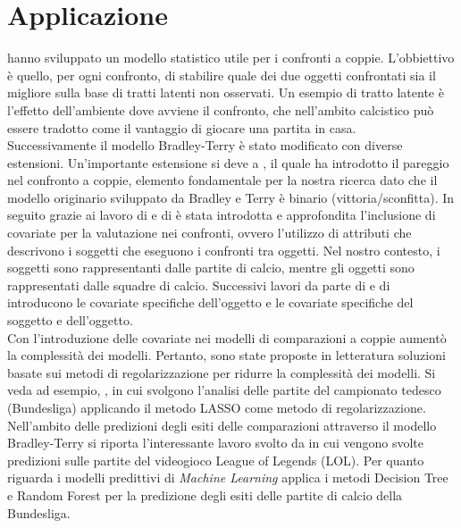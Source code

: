 \section{Applicazione}
\textcite{bradley1952rank} hanno sviluppato un modello statistico utile per i confronti a coppie. L'obbiettivo è quello, per ogni confronto, di stabilire quale dei due oggetti confrontati sia il migliore sulla base di tratti latenti non osservati. Un esempio di tratto latente è l'effetto dell'ambiente dove avviene il confronto, che nell'ambito calcistico può essere tradotto come il vantaggio di giocare una partita in casa. \\
Successivamente il modello Bradley-Terry è stato modificato con diverse estensioni. Un'importante estensione si deve a \textcite{davidson1970extending}, il quale ha introdotto il pareggio nel confronto a coppie, elemento fondamentale per la nostra ricerca dato che il modello originario sviluppato da Bradley e Terry è binario (vittoria/sconfitta). In seguito grazie ai lavoro di \textcite{francis2010} e di \textcite{Turner2012Firth} è stata introdotta e approfondita l'inclusione di covariate per la valutazione nei confronti, ovvero l'utilizzo di attributi che descrivono i soggetti che eseguono i confronti tra oggetti. Nel nostro contesto, i soggetti sono rappresentanti dalle partite di calcio, mentre gli oggetti sono rappresentati dalle squadre di calcio. Successivi lavori da parte di \textcite{thurner2000policy} e di \textcite{mauerer2015modeling} introducono le covariate specifiche dell'oggetto e le covariate specifiche del soggetto e dell'oggetto.\\ %
Con l'introduzione delle covariate nei modelli di comparazioni a coppie aumentò la complessità dei modelli. Pertanto, sono state proposte in letteratura soluzioni basate sui metodi di regolarizzazione per ridurre la complessità dei modelli. Si veda ad esempio, \textcite{schauberger2019btllasso}, in cui svolgono l'analisi delle partite del campionato tedesco (Bundesliga) applicando il metodo LASSO come metodo di regolarizzazione.\\
Nell'ambito delle predizioni degli esiti delle comparazioni attraverso il modello Bradley-Terry si riporta l’interessante lavoro svolto da \textcite{kang2015poisson} in cui vengono svolte predizioni sulle partite del videogioco League of Legends (LOL). Per quanto riguarda i modelli predittivi di \emph{Machine Learning} \textcite{xu2021prediction} applica i metodi Decision Tree e Random Forest per la predizione degli esiti delle partite di calcio della Bundesliga.

